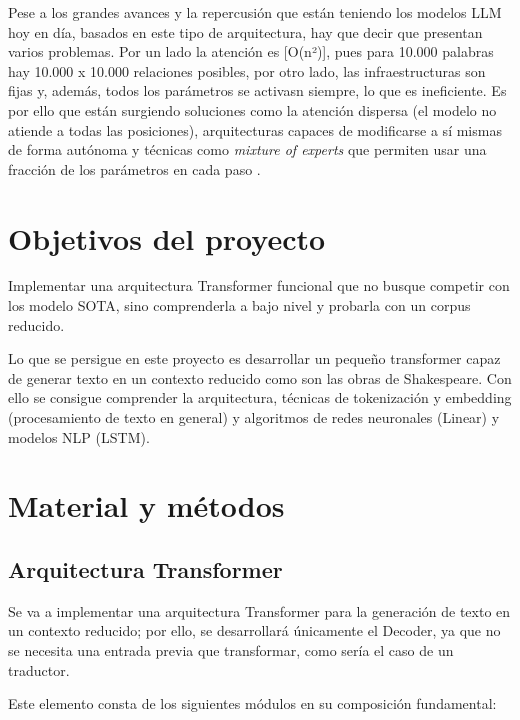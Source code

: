 \documentclass[11pt]{book}
\newcommand{\clearemptydoublepage}{\newpage{\pagestyle{empty}\cleardoublepage}}
\theoremstyle{plain}
\theoremstyle{definition}
\begin{document}
Pese a los grandes avances y la repercusión que están teniendo los modelos LLM hoy en día, basados en este tipo de arquitectura, hay que decir que presentan varios problemas. Por un lado la atención es [O(n²)], pues para 10.000 palabras hay 10.000 x 10.000 relaciones posibles, por otro lado, las infraestructuras son fijas y, además, todos los parámetros se activasn siempre, lo que es ineficiente. Es por ello que están surgiendo soluciones como la atención dispersa (el modelo no atiende a todas las posiciones), arquitecturas capaces de modificarse a sí mismas de forma autónoma y técnicas como \textit{mixture of experts} que permiten usar una fracción de los parámetros en cada paso \parencite{plainenglish2021gpt}.

\clearemptydoublepage

\chapter{Objetivos del proyecto}
Implementar una arquitectura Transformer funcional que no busque competir
con los modelo SOTA, sino comprenderla a bajo nivel y probarla con un corpus
reducido.


Lo que se persigue en este proyecto es desarrollar un pequeño transformer capaz
de generar texto en un contexto reducido como son las obras de Shakespeare. Con
ello se consigue comprender la arquitectura, técnicas de tokenización y embedding
(procesamiento de texto en general) y algoritmos de redes neuronales (Linear) y
modelos NLP (LSTM).


\clearemptydoublepage

\chapter{Material y métodos}
\section{Arquitectura Transformer} \label{Arquitectura Transformer}

Se va a implementar una arquitectura Transformer para la generación de texto en un contexto reducido; por ello, se desarrollará únicamente el Decoder, ya que no se necesita una entrada previa que transformar, como sería el caso de un traductor.


Este elemento consta de los siguientes módulos en su composición fundamental:
\end{document}
